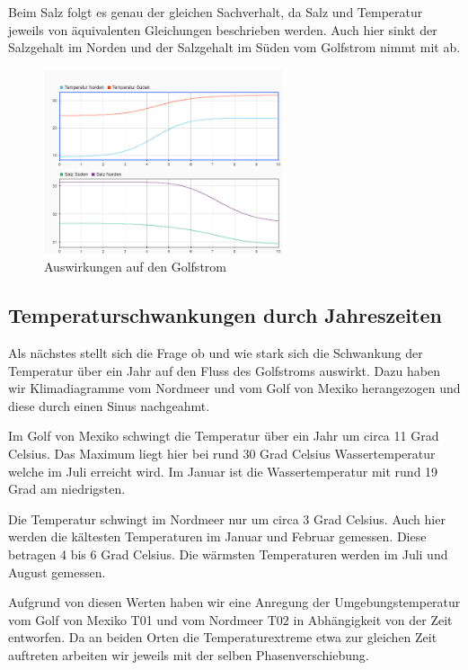 \documentclass[a4paper,twoside]{article}
\begin{document}
	Beim Salz folgt es genau der gleichen Sachverhalt, da Salz und Temperatur jeweils von äquivalenten Gleichungen beschrieben werden. Auch hier sinkt der Salzgehalt im Norden und der Salzgehalt im Süden vom Golfstrom nimmt mit ab.

	\begin{figure}[!h]
  		\centering
 		\includegraphics[width=7cm]{../Diagramme/Arktis_schmiltz_werte.png}
  		\caption{Auswirkungen auf den Golfstrom}
  		\label{fig:schmilztGolf}
	\end{figure}

	\subsection{Temperaturschwankungen durch Jahreszeiten} \label{TempDurchJahreszeiten}
	
	Als nächstes stellt sich die Frage ob und wie stark sich die Schwankung der Temperatur über ein Jahr auf den Fluss des Golfstroms auswirkt. Dazu haben wir Klimadiagramme vom Nordmeer und vom Golf von Mexiko herangezogen und diese durch einen Sinus nachgeahmt. 
	
	Im Golf von Mexiko schwingt die Temperatur über ein Jahr um circa 11 Grad Celsius. Das Maximum liegt hier bei rund 30 Grad Celsius Wassertemperatur welche im Juli erreicht wird. Im Januar ist die Wassertemperatur mit rund 19 Grad am niedrigsten.
	
	Die Temperatur schwingt im Nordmeer nur um circa 3 Grad Celsius. Auch hier werden die kältesten Temperaturen im Januar und Februar gemessen. Diese betragen 4 bis 6 Grad Celsius. Die wärmsten Temperaturen werden im Juli und August gemessen. 
	
	Aufgrund von diesen Werten haben wir eine Anregung der Umgebungstemperatur vom Golf von Mexiko T01 und vom Nordmeer T02 in Abhängigkeit von der Zeit entworfen. Da an beiden Orten die Temperaturextreme etwa zur gleichen Zeit auftreten arbeiten wir jeweils mit der selben Phasenverschiebung. 
	
\end{document}
